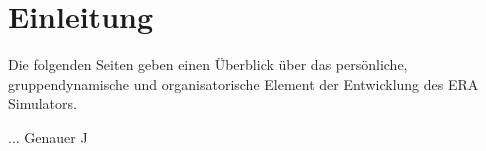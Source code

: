 
\section{Einleitung}

Die folgenden Seiten geben einen Überblick über das persönliche, gruppendynamische und organisatorische Element der Entwicklung des ERA Simulators.

... Genauer ^^
